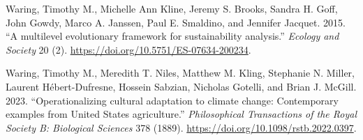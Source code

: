 \documentclass[letterpaper]{article}
\newlength{\cslhangindent}
\newenvironment{CSLReferences}[2] %
 {\begin{list}{}{%
  \setlength{\itemindent}{0pt}
  \setlength{\leftmargin}{0pt}
  \setlength{\parsep}{0pt}
  \ifodd #1
   \setlength{\leftmargin}{\cslhangindent}
   \setlength{\itemindent}{-1\cslhangindent}
  \fi
  \setlength{\itemsep}{#2\baselineskip}}}
 {\end{list}}
\begin{document}
\begin{CSLReferences}{1}{0}
Waring, Timothy M., Michelle Ann Kline, Jeremy S. Brooks, Sandra H.
Goff, John Gowdy, Marco A. Janssen, Paul E. Smaldino, and Jennifer
Jacquet. 2015. {``{A multilevel evolutionary framework for
sustainability analysis}.''} \emph{Ecology and Society} 20 (2).
\url{https://doi.org/10.5751/ES-07634-200234}.

Waring, Timothy M., Meredith T. Niles, Matthew M. Kling, Stephanie N.
Miller, Laurent Hébert-Dufresne, Hossein Sabzian, Nicholas Gotelli, and
Brian J. McGill. 2023. {``{Operationalizing cultural adaptation to
climate change: Contemporary examples from United States
agriculture}.''} \emph{Philosophical Transactions of the Royal Society
B: Biological Sciences} 378 (1889).
\url{https://doi.org/10.1098/rstb.2022.0397}.

\end{CSLReferences}
\end{document}
